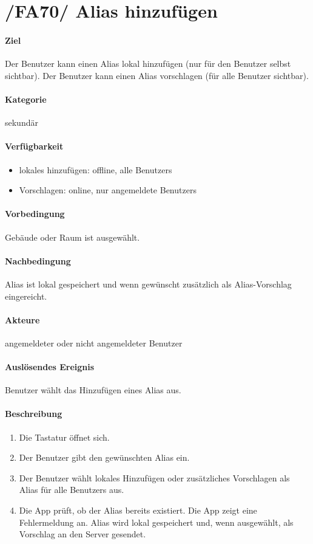 \section{/FA70/ Alias hinzufügen}
\label{/FA70/}
\paragraph{Ziel}
Der \Gls{Benutzer} kann einen \Gls{Alias} \gls{lokal} hinzufügen (nur für den \Gls{Benutzer} selbst sichtbar). Der \Gls{Benutzer} kann einen \Gls{Alias} vorschlagen (für alle \Gls{Benutzer} sichtbar).
\paragraph{Kategorie}
sekundär
\paragraph{Verfügbarkeit}
\begin{itemize}
    \item \Gls{lokal}es hinzufügen: offline, alle \Glspl{Benutzer}
    \item Vorschlagen: online, nur angemeldete \Glspl{Benutzer}
\end{itemize}

\paragraph{Vorbedingung}
Gebäude oder Raum ist ausgewählt.
\paragraph{Nachbedingung}
\Gls{Alias} ist \gls{lokal} gespeichert und wenn gewünscht zusätzlich als \Gls{Alias-Vorschlag} eingereicht.
\paragraph{Akteure}
angemeldeter oder nicht angemeldeter \Gls{Benutzer}
\paragraph{Auslösendes Ereignis}
\Gls{Benutzer} wählt das Hinzufügen eines \Gls{Alias} aus.
\paragraph{Beschreibung}
\begin{enumerate}
    \item Die Tastatur öffnet sich.
    \item Der \Gls{Benutzer} gibt den gewünschten \Gls{Alias} ein.
    \item Der \Gls{Benutzer} wählt lokales Hinzufügen oder zusätzliches Vorschlagen als \Gls{Alias} für alle \Glspl{Benutzer} aus.
    \item Die App prüft, ob der \Gls{Alias} bereits existiert.
     Die App zeigt eine Fehlermeldung an.
     \Gls{Alias} wird \gls{lokal} gespeichert und, wenn ausgewählt, als Vorschlag an den \Gls{Server} gesendet.
\end{enumerate}
